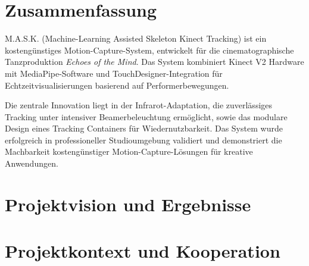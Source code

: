 \documentclass[
paper=A4,        
fontsize=12,        
DIV=11,           
parskip=half,    
headsepline,   
numbers=noenddot  
]{scrartcl}
\begin{document}
	
	\hypersetup{pageanchor=false}
	
			
		
 	\newpage
    \singlespacing
    
    \thispagestyle{empty}
    \section*{Zusammenfassung}
    M.A.S.K. (Machine-Learning Assisted Skeleton Kinect Tracking) ist ein kostengünstiges Motion-Capture-System, entwickelt für die cinematographische Tanzproduktion \textit{Echoes of the Mind}. Das System kombiniert Kinect V2 Hardware mit MediaPipe-Software und TouchDesigner-Integration für Echtzeitvisualisierungen basierend auf Performerbewegungen.
    
    Die zentrale Innovation liegt in der Infrarot-Adaptation, die zuverlässiges Tracking unter intensiver Beamerbeleuchtung ermöglicht, sowie das modulare Design eines Tracking Containers für Wiedernutzbarkeit. Das System wurde erfolgreich in professioneller Studioumgebung validiert und demonstriert die Machbarkeit kostengünstiger Motion-Capture-Lösungen für kreative Anwendungen.
    
    \newpage
    
    \thispagestyle{empty}
    {\small\tableofcontents}
    \thispagestyle{empty}
    
    \newpage
    \onehalfspacing
    
    
    \newpage
	\hypersetup{pageanchor=true}
	
	\setcounter{page}{1}
	
	\captionsetup[subfigure]{labelformat=empty}


    \section{Projektvision und Ergebnisse}\label{sec:vision}

    \newpage

    \section{Projektkontext und Kooperation}\label{sec:context}
\end{document}
